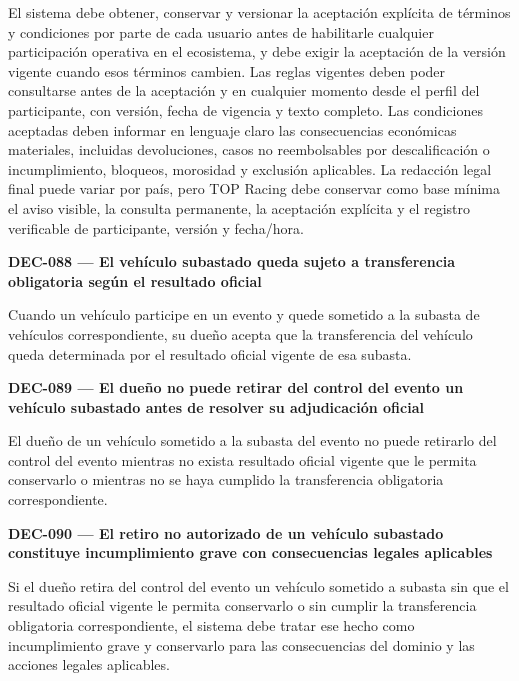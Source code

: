 \documentclass[10pt,letterpaper]{article}
\begin{document}
El sistema debe obtener, conservar y versionar la aceptación explícita de términos y condiciones por parte de cada usuario antes de habilitarle cualquier participación operativa en el ecosistema, y debe exigir la aceptación de la versión vigente cuando esos términos cambien. Las reglas vigentes deben poder consultarse antes de la aceptación y en cualquier momento desde el perfil del participante, con versión, fecha de vigencia y texto completo. Las condiciones aceptadas deben informar en lenguaje claro las consecuencias económicas materiales, incluidas devoluciones, casos no reembolsables por descalificación o incumplimiento, bloqueos, morosidad y exclusión aplicables. La redacción legal final puede variar por país, pero TOP Racing debe conservar como base mínima el aviso visible, la consulta permanente, la aceptación explícita y el registro verificable de participante, versión y fecha/hora.\par\vspace{0.45em}
\noindent\textbf{DEC-088 --- El vehículo subastado queda sujeto a transferencia obligatoria según el resultado oficial}\par
Cuando un vehículo participe en un evento y quede sometido a la subasta de vehículos correspondiente, su dueño acepta que la transferencia del vehículo queda determinada por el resultado oficial vigente de esa subasta.\par\vspace{0.45em}
\noindent\textbf{DEC-089 --- El dueño no puede retirar del control del evento un vehículo subastado antes de resolver su adjudicación oficial}\par
El dueño de un vehículo sometido a la subasta del evento no puede retirarlo del control del evento mientras no exista resultado oficial vigente que le permita conservarlo o mientras no se haya cumplido la transferencia obligatoria correspondiente.\par\vspace{0.45em}
\noindent\textbf{DEC-090 --- El retiro no autorizado de un vehículo subastado constituye incumplimiento grave con consecuencias legales aplicables}\par
Si el dueño retira del control del evento un vehículo sometido a subasta sin que el resultado oficial vigente le permita conservarlo o sin cumplir la transferencia obligatoria correspondiente, el sistema debe tratar ese hecho como incumplimiento grave y conservarlo para las consecuencias del dominio y las acciones legales aplicables.\par\vspace{0.45em}
\end{document}
